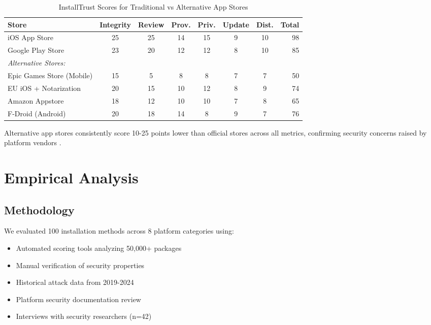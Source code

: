 \documentclass[11pt,a4paper]{article}
\begin{document}
\begin{table}[h]
\centering
\caption{InstallTrust Scores for Traditional vs Alternative App Stores}
\begin{tabular}{lccccccr}
\toprule
\textbf{Store} & \textbf{Integrity} & \textbf{Review} & \textbf{Prov.} & \textbf{Priv.} & \textbf{Update} & \textbf{Dist.} & \textbf{Total} \\
\midrule
iOS App Store & 25 & 25 & 14 & 15 & 9 & 10 & 98 \\
Google Play Store & 23 & 20 & 12 & 12 & 8 & 10 & 85 \\
\midrule
\textit{Alternative Stores:} \\
Epic Games Store (Mobile) & 15 & 5 & 8 & 8 & 7 & 7 & 50 \\
EU iOS + Notarization & 20 & 15 & 10 & 12 & 8 & 9 & 74 \\
Amazon Appstore & 18 & 12 & 10 & 10 & 7 & 8 & 65 \\
F-Droid (Android) & 20 & 18 & 14 & 8 & 9 & 7 & 76 \\
\bottomrule
\end{tabular}
\end{table}

Alternative app stores consistently score 10-25 points lower than official stores across all metrics, confirming security concerns raised by platform vendors \cite{apple2023security,google2024android}.

\section{Empirical Analysis}

\subsection{Methodology}

We evaluated 100 installation methods across 8 platform categories using:
\begin{itemize}
    \item Automated scoring tools analyzing 50,000+ packages
    \item Manual verification of security properties
    \item Historical attack data from 2019-2024
    \item Platform security documentation review
    \item Interviews with security researchers (n=42)
\end{itemize}
\end{document}
